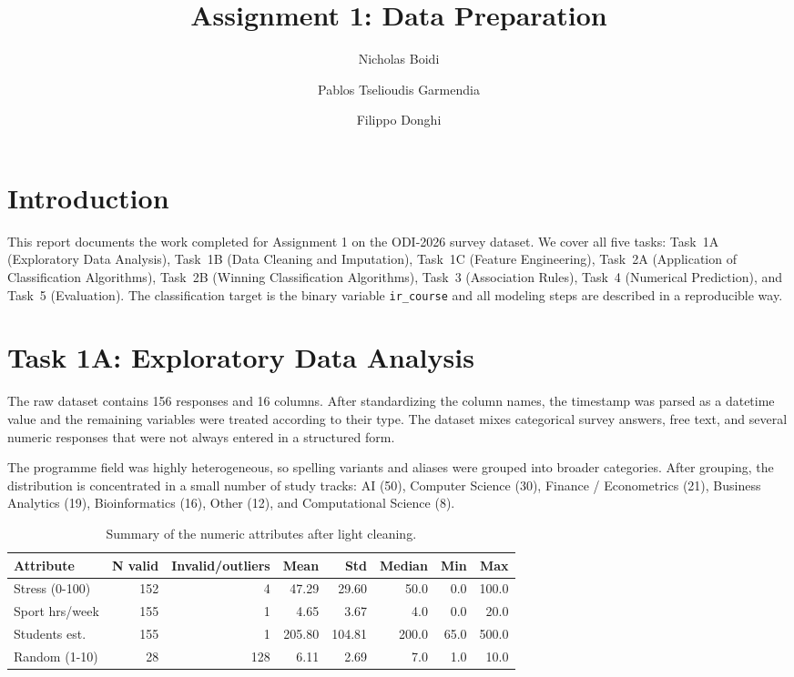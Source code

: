 \documentclass[runningheads]{llncs}
\begin{document}
\title{Assignment 1: Data Preparation}
\author{Nicholas Boidi \and Pablos Tselioudis Garmendia \and Filippo Donghi}

\maketitle

\section{Introduction}
This report documents the work completed for Assignment 1 on the ODI-2026 survey dataset. We cover all five tasks: Task~1A (Exploratory Data Analysis), Task~1B (Data Cleaning and Imputation), Task~1C (Feature Engineering), Task~2A (Application of Classification Algorithms), Task~2B (Winning Classification Algorithms), Task~3 (Association Rules), Task~4 (Numerical Prediction), and Task~5 (Evaluation). The classification target is the binary variable \texttt{ir\_course} and all modeling steps are described in a reproducible way.

\section{Task 1A: Exploratory Data Analysis}
The raw dataset contains 156 responses and 16 columns. After standardizing the column names, the timestamp was parsed as a datetime value and the remaining variables were treated according to their type. The dataset mixes categorical survey answers, free text, and several numeric responses that were not always entered in a structured form.

The programme field was highly heterogeneous, so spelling variants and aliases were grouped into broader categories. After grouping, the distribution is concentrated in a small number of study tracks: AI (50), Computer Science (30), Finance / Econometrics (21), Business Analytics (19), Bioinformatics (16), Other (12), and Computational Science (8).

\begin{table}
\caption{Summary of the numeric attributes after light cleaning.}
\label{tab:numeric}
\centering
\begin{tabular}{|l|r|r|r|r|r|r|r|}
\hline
Attribute & N valid & Invalid/outliers & Mean & Std & Median & Min & Max \\
\hline
Stress (0-100) & 152 & 4 & 47.29 & 29.60 & 50.0 & 0.0 & 100.0 \\
Sport hrs/week & 155 & 1 & 4.65 & 3.67 & 4.0 & 0.0 & 20.0 \\
Students est. & 155 & 1 & 205.80 & 104.81 & 200.0 & 65.0 & 500.0 \\
Random (1-10) & 28 & 128 & 6.11 & 2.69 & 7.0 & 1.0 & 10.0 \\
\hline
\end{tabular}
\end{table}
\end{document}
